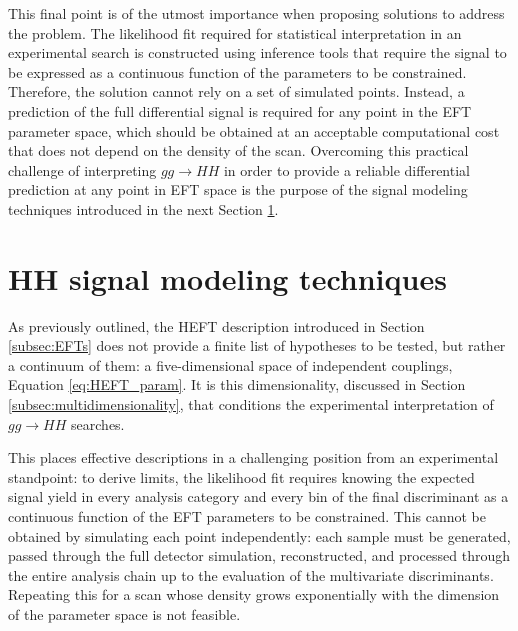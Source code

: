 This final point is of the utmost importance when proposing solutions to address the problem. The likelihood fit required for statistical interpretation in an experimental search is constructed using inference tools that require the signal to be expressed as a continuous function of the parameters to be constrained. Therefore, the solution cannot rely on a set of simulated points. Instead, a prediction of the full differential signal is required for any point in the EFT parameter space, which should be obtained at an acceptable computational cost that does not depend on the density of the scan. Overcoming this practical challenge of interpreting $gg\to HH$ in order to provide a reliable differential prediction at any point in EFT space is the purpose of the signal modeling techniques introduced in the next Section \ref{sec:Modeling}.


\section{HH signal modeling techniques}
\label{sec:Modeling}
%
As previously outlined, the HEFT description introduced in Section \ref{subsec:EFTs} does not provide a finite list of hypotheses to be tested, but rather a continuum of them: a five-dimensional space of independent couplings, Equation \ref{eq:HEFT_param}. It is this dimensionality, discussed in Section \ref{subsec:multidimensionality}, that conditions the experimental interpretation of $gg\to HH$ searches.


This places effective descriptions in a challenging position from an experimental standpoint: to derive limits, the likelihood fit requires knowing the expected signal yield in every analysis category and every bin of the final discriminant as a continuous function of the EFT parameters to be constrained. This cannot be obtained by simulating each point independently: each sample must be generated, passed through the full detector simulation, reconstructed, and processed through the entire analysis chain up to the evaluation of the multivariate discriminants. Repeating this for a scan whose density grows exponentially with the dimension of the parameter space is not feasible.



